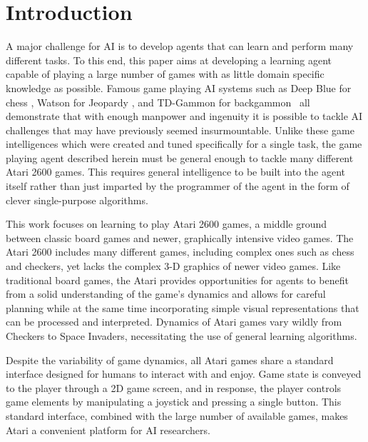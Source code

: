 \documentclass{sig-alternate}
\begin{document}
\section{Introduction}
A major challenge for AI is to develop agents that can learn and perform many different tasks. To this end, this paper aims at developing a learning agent capable of playing a large number of games with as little domain specific knowledge as possible. Famous game playing AI systems such as Deep Blue for chess \cite{campbell02}, Watson for Jeopardy \cite{ferrucci10}, and TD-Gammon for backgammon~\cite{tesauro_94} all demonstrate that with enough manpower and ingenuity it is possible to tackle AI challenges that may have previously seemed insurmountable. Unlike these game intelligences which were created and tuned specifically for a single task, the game playing agent described herein must be general enough to tackle many different Atari 2600 games. This requires general intelligence to be built into the agent itself rather than just imparted by the programmer of the agent in the form of clever single-purpose algorithms.

This work focuses on learning to play Atari 2600 games, a middle ground between classic board games and newer, graphically intensive video games. The Atari 2600 includes many different games, including complex ones such as chess and checkers, yet lacks the complex 3-D graphics of newer video games. Like traditional board games, the Atari provides opportunities for agents to benefit from a solid understanding of the game's dynamics and allows for careful planning while at the same time incorporating simple visual representations that can be processed and interpreted. Dynamics of Atari games vary wildly from Checkers to Space Invaders, necessitating the use of general learning algorithms.

Despite the variability of game dynamics, all Atari games share a standard interface designed for humans to interact with and enjoy. Game state is conveyed to the player through a 2D game screen, and in response, the player controls game elements by manipulating a joystick and pressing a single button. This standard interface, combined with the large number of available games, makes Atari a convenient platform for AI researchers. 
\end{document}

